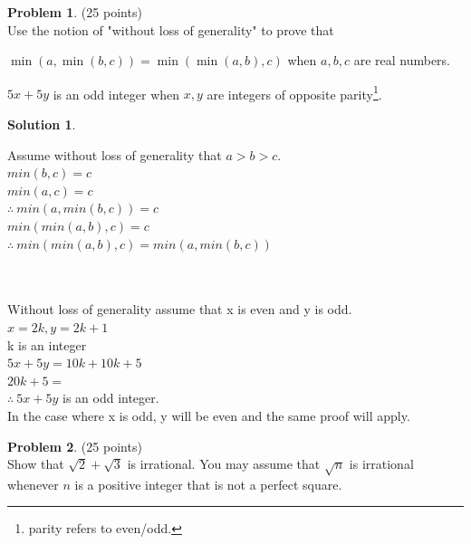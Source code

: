 \documentclass{article}
\theoremstyle{definition}
\newtheorem{problem}{Problem}
\newtheorem*{solution}{Solution}
\begin{document}
\newpage

\begin{problem} (25 points)\\
Use the notion of "without loss of generality" to prove that
\begin{compactenum}
\item $\min(a,\min(b,c)) = \min(\min(a,b),c)$ when $a,b,c$ are real numbers.
\item $5x+5y$ is an odd integer when $x,y$ are integers of opposite parity\footnote{parity refers to even/odd.}.
\end{compactenum}
\end{problem}

\begin{solution}\ \\
\begin{compactenum}
\item
Assume without loss of generality that $a > b > c$.\ \\
$min(b,c) = c$\ \\
$min(a,c) = c$\ \\
$\therefore \ min(a,min(b,c)) = c$\ \\
$min(min(a,b),c) = c$\ \\
$\therefore \ min(min(a,b),c) = min(a,min(b,c))$
\ \\
\ \\
\ \\
\item
Without loss of generality assume that x is even and y is odd.\ \\
$x=2k , y=2k+1$\ \\
k is an integer\ \\
$5x + 5y = 10k + 10k + 5$\ \\
$20k + 5 = $\ \\
$\therefore \ 5x+5y$ is an odd integer. \ \\
In the case where x is odd, y will be even and the same proof will apply.\ \\

\end{compactenum}
\end{solution}

\newpage

\begin{problem} (25 points)\\
Show that $\sqrt{2} + \sqrt{3}$ is irrational.  You may assume that $\sqrt{n}$ is irrational whenever $n$ is a positive integer that is not a perfect square.
\end{problem}
\end{document}
